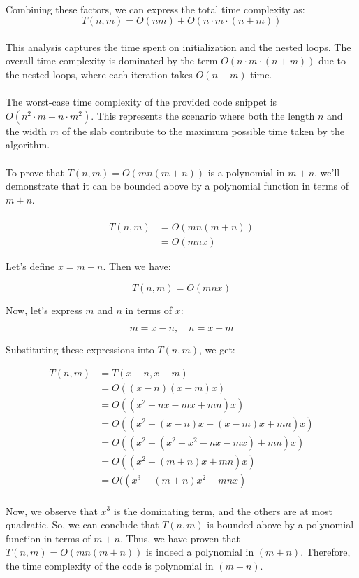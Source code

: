 \documentclass{article}
\begin{document}
{\begin{enumerate}
\end{enumerate}
\\
Combining these factors, we can express the total time complexity as:
\\
\[
T(n, m) = O(nm) + O(n \cdot m \cdot (n + m))
\]
\\
This analysis captures the time spent on initialization and the nested loops. The overall time complexity is dominated by the term $O(n \cdot m \cdot (n + m))$ due to the nested loops, where each iteration takes $O(n + m)$ time.
\\\\
The worst-case time complexity of the provided code snippet is $O(n^2 \cdot m + n \cdot m^2)$. This represents the scenario where both the length $n$ and the width $m$ of the slab contribute to the maximum possible time taken by the algorithm.
\\\\
To prove that $T(n, m) = O(mn(m + n))$ is a polynomial in $m + n$, we'll demonstrate that it can be bounded above by a polynomial function in terms of $m + n$.\\\\
\begin{align*}
T(n, m) &= O(mn(m + n)) \\
&= O(mnx)
\end{align*}

Let's define \( x = m + n \). Then we have:

\[
T(n, m) = O(mnx)
\]

Now, let's express \( m \) and \( n \) in terms of \( x \):

\[
m = x - n, \quad n = x - m
\]

Substituting these expressions into \( T(n, m) \), we get:

\begin{align*}
T(n, m) &= T(x - n, x - m) \\
&= O((x - n)(x - m)x) \\
&= O((x^2 - nx - mx + mn)x) \\
&= O((x^2 - (x - n)x - (x - m)x + mn)x) \\
&= O((x^2 - (x^2 + x^2 - nx - mx) + mn)x) \\
&= O((x^2 - (m+n)x + mn)x) \\
&= O((x^3 - (m + n)x^2 + mnx)
\end{align*}
\\
Now, we observe that \( x^3 \) is the dominating term, and the others are at most quadratic. So, we can conclude that \( T(n, m) \) is bounded above by a polynomial function in terms of \( m + n \). Thus, we have proven that \( T(n, m) = O(mn(m + n)) \) is indeed a polynomial in \( (m + n) \). Therefore, the time complexity of the code is polynomial in \( (m + n) \).


}
\end{document}
